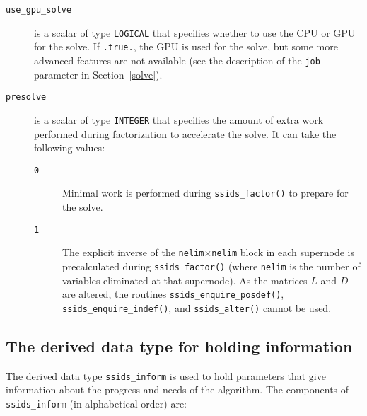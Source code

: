 \documentclass{spral}
\begin{document}

\begin{description}
\item[\texttt{use\_gpu\_solve}] is a scalar of type {\tt LOGICAL} that specifies
   whether to use the CPU or GPU for the solve. If \texttt{.true.}, the GPU is
   used for the solve, but some more advanced features are not available (see
   the description of the \texttt{job} parameter in Section~\ref{solve}).
\item[\texttt{presolve}] is a scalar of type {\tt INTEGER} that specifies the
   amount of extra work performed during factorization to accelerate the solve.
   It can take the following values:
   \begin{description}
      \item[\texttt{0}] Minimal work is performed during {\tt ssids\_factor()}
         to prepare for the solve.
      \item[\texttt{1}] The explicit inverse of the
         \texttt{nelim}$\times$\texttt{nelim} block in each supernode is
         precalculated during {\tt ssids\_factor()} (where \texttt{nelim} is
         the number of variables eliminated at that supernode). As the matrices
         $L$ and $D$ are altered, the routines {\tt ssids\_enquire\_posdef()},
         {\tt ssids\_enquire\_indef()}, and {\tt ssids\_alter()} cannot be used.
   \end{description}
\end{description}


\subsection{The derived data type for holding information}
\label{typeinform}
The derived data type {\tt ssids\_inform}
is used to hold parameters that give information about the progress and needs
of the algorithm. The components of {\tt ssids\_inform}
(in alphabetical order) are:
\end{document}
